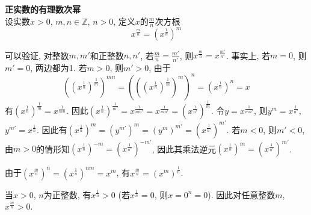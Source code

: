 \begin{dfn} \textbf{正实数的有理数次幂}\\
设实数$x>0$, $m,n\in \mathbb{Z}$, $n>0$, 定义$x$的$\frac{m}{n}$次方根
\begin{equation}
    x^{\frac{m}{n}}=\left(x^{\frac{1}{n}}\right)^m
\end{equation}
\end{dfn}
\par 可以验证, 对整数$m,m'$和正整数$n,n'$, 若$\frac{m}{n}=\frac{m'}{n'}$, 则$x^{\frac{m}{n}}=x^{\frac{m'}{n'}}$. 事实上, 若$m=0$, 则$m'=0$, 两边都为1. 若$m>0$, 则$m'>0$, 由于
\begin{equation}
    ((x^{\frac{1}{n}})^{\frac{1}{m}})^{mn}=(((x^{\frac{1}{n}})^{\frac{1}{m}})^m)^n=(x^{\frac{1}{n}})^n=x
\end{equation}
有$(x^{\frac{1}{n}})^{\frac{1}{m}}=x^{\frac{1}{mn}}$. 因此$(x^{\frac{1}{n}})^{\frac{1}{m'}}=x^{\frac{1}{nm'}}=x^{\frac{1}{mn'}}=(x^{\frac{1}{n'}})^{\frac{1}{m}}$. 令$y=x^{\frac{1}{mn'}}$, 则$y^{m}=x^{\frac{1}{n'}}$, $y^{m'}=x^{\frac{1}{n}}$. 因此有$(x^{\frac{1}{n}})^m=(y^{m'})^m=(y^m)^{m'}=(x^{\frac{1}{n'}})^{m'}$. 若$m<0$, 则$m'<0$, 由$m>0$的情形知$(x^{\frac{1}{n}})^{-m}=(x^{\frac{1}{n'}})^{-m'}$, 因此其乘法逆元$(x^{\frac{1}{n}})^{m}=(x^{\frac{1}{n'}})^{m'}$. 

\par 由于$(x^{\frac{m}{n}})^n=(x^{\frac{1}{n}})^{nm}=x^m$, 有$x^{\frac{m}{n}} = (x^m)^{\frac{1}{n}}$. 

\par 当$x>0$, $n$为正整数, 有$x^{\frac{1}{n}}>0$ (若$x^{\frac{1}{n}}=0$, 则$x=0^n=0$). 因此对任意整数$m$, $x^{\frac{m}{n}}>0$.

